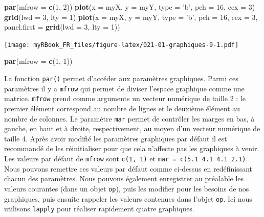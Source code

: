 \documentclass[
]{book}
\newenvironment{Shaded}{\begin{snugshade}}{\end{snugshade}}
\newcommand{\DataTypeTok}[1]{\textcolor[rgb]{0.13,0.29,0.53}{#1}}
\newcommand{\DecValTok}[1]{\textcolor[rgb]{0.00,0.00,0.81}{#1}}
\newcommand{\KeywordTok}[1]{\textcolor[rgb]{0.13,0.29,0.53}{\textbf{#1}}}
\newcommand{\NormalTok}[1]{#1}
\newcommand{\StringTok}[1]{\textcolor[rgb]{0.31,0.60,0.02}{#1}}
\begin{document}
\begin{Shaded}
\begin{Highlighting}[]
\KeywordTok{par}\NormalTok{(}\DataTypeTok{mfrow =} \KeywordTok{c}\NormalTok{(}\DecValTok{1}\NormalTok{, }\DecValTok{2}\NormalTok{))}
\KeywordTok{plot}\NormalTok{(}\DataTypeTok{x =}\NormalTok{ myX, }\DataTypeTok{y =}\NormalTok{ myY, }
  \DataTypeTok{type =} \StringTok{'b'}\NormalTok{, }\DataTypeTok{pch =} \DecValTok{16}\NormalTok{, }\DataTypeTok{cex =} \DecValTok{3}\NormalTok{) }
\KeywordTok{grid}\NormalTok{(}\DataTypeTok{lwd =} \DecValTok{3}\NormalTok{, }\DataTypeTok{lty =} \DecValTok{1}\NormalTok{)}
\KeywordTok{plot}\NormalTok{(}\DataTypeTok{x =}\NormalTok{ myX, }\DataTypeTok{y =}\NormalTok{ myY, }
  \DataTypeTok{type =} \StringTok{'b'}\NormalTok{, }\DataTypeTok{pch =} \DecValTok{16}\NormalTok{, }\DataTypeTok{cex =} \DecValTok{3}\NormalTok{, }
  \DataTypeTok{panel.first =} \KeywordTok{grid}\NormalTok{(}\DataTypeTok{lwd =} \DecValTok{3}\NormalTok{, }\DataTypeTok{lty =} \DecValTok{1}\NormalTok{)) }
\end{Highlighting}
\end{Shaded}

\texttt{[image: myRBook\_FR\_files/figure-latex/021-01-graphiques-9-1.pdf]}

\begin{Shaded}
\begin{Highlighting}[]
\KeywordTok{par}\NormalTok{(}\DataTypeTok{mfrow =} \KeywordTok{c}\NormalTok{(}\DecValTok{1}\NormalTok{, }\DecValTok{1}\NormalTok{))}
\end{Highlighting}
\end{Shaded}

La fonction \texttt{par()} permet d'accéder aux paramètres graphiques. Parmi ces paramètres il y a \texttt{mfrow} qui permet de diviser l'espace graphique comme une matrice. \texttt{mfrow} prend comme arguments un vecteur numérique de taille 2 : le premier élément correspond au nombre de lignes et le deuxième élément au nombre de colonnes. Le paramètre \texttt{mar} permet de contrôler les marges en bas, à gauche, en haut et à droite, respectivement, au moyen d'un vecteur numérique de taille 4. Après avoir modifié les paramètres graphiques par défaut il est recommandé de les réinitialiser pour que cela n'affecte pas les graphiques à venir. Les valeurs par défaut de \texttt{mfrow} sont \texttt{c(1,\ 1)} et \texttt{mar\ =\ c(5.1\ 4.1\ 4.1\ 2.1)}. Nous pouvons remettre ces valeurs par défaut comme ci-dessus en redéfinissant chacun des paramètres. Nous pouvons également enregistrer au préalable les valeurs courantes (dans un objet \texttt{op}), puis les modifier pour les besoins de nos graphiques, puis ensuite rappeler les valeurs contenues dans l'objet \texttt{op}. Ici nous utilisons \texttt{lapply} pour réaliser rapidement quatre graphiques.
\end{document}
